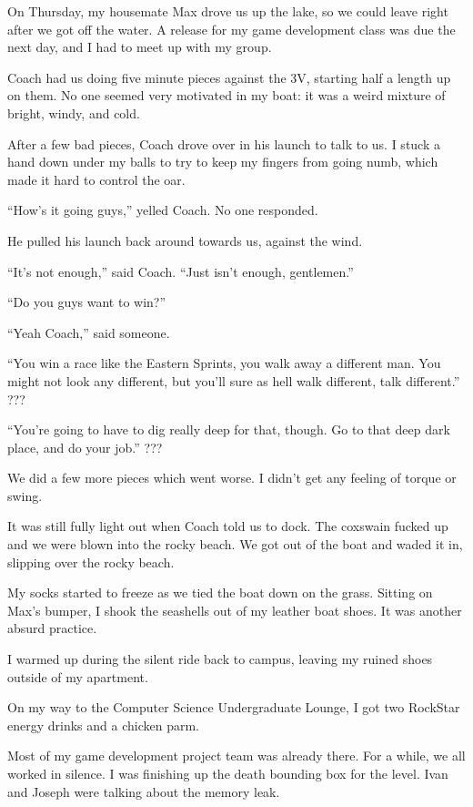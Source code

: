 On Thursday, my housemate Max drove us up the lake, so we could leave right
after we got off the water.  A release for my game development class was due the
next day, and I had to meet up with my group.

Coach had us doing five minute pieces against the 3V, starting half a
length up on them.  No one seemed very motivated in my boat: it was a weird
mixture of bright, windy, and cold. 

After a few bad pieces, Coach drove over in his launch to talk to us.  I stuck a
hand down under my balls to try to keep my fingers from going numb, which made
it hard to control the oar.

``How's it going guys,'' yelled Coach.  No one responded.

He pulled his launch back around towards us, against the wind.

``It's not enough,'' said Coach.  ``Just isn't enough, gentlemen.''

``Do you guys want to win?''

``Yeah Coach,'' said someone.

``You win a race like the Eastern Sprints, you walk away a different man.  You
might not look any different, but you'll sure as hell walk different, talk
different.'' ???

``You're going to have to dig really deep for that, though.  Go to that deep
dark place, and do your job.''  ???

We did a few more pieces which went worse.  I didn't get any feeling of torque
or swing.  

It was still fully light out when Coach told us to dock.  The coxswain fucked up
and we were blown into the rocky beach.  We got out of the boat and waded it in,
slipping over the rocky beach. 

My socks started to freeze as we tied the boat down on the grass.  Sitting on
Max's bumper, I shook the seashells out of my leather boat shoes.  It was
another absurd practice.  

I warmed up during the silent ride back to campus, leaving my ruined shoes
outside of my apartment.  

On my way to the Computer Science Undergraduate Lounge, I got two RockStar
energy drinks and a chicken parm.

Most of my game development project team was already there.  For a while, we all
worked in silence.  I was finishing up the death bounding box for the level.
Ivan and Joseph were talking about the memory leak.


